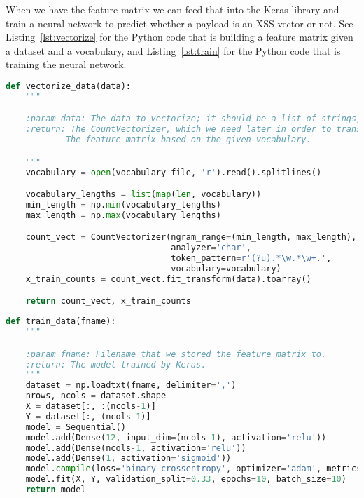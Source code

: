 \documentclass[10pt,journal,compsoc]{IEEEtran}
\begin{document}
When we have the feature matrix we can feed that into the Keras library and train a neural network to predict whether
a payload is an XSS vector or not. See Listing~\ref{lst:vectorize} for the Python code that is building a feature matrix
given a dataset and a vocabulary, and Listing~\ref{lst:train} for the Python code that is training the neural network.


\begin{lstlisting}[language=Python, caption={Python function that builds the feature matrix based on the dataset.},
                    label={lst:vectorize}]
def vectorize_data(data):
    """

    :param data: The data to vectorize; it should be a list of strings, one per line.
    :return: The CountVectorizer, which we need later in order to transform incoming requests to a feature vector
            The feature matrix based on the given vocabulary.

    """
    vocabulary = open(vocabulary_file, 'r').read().splitlines()

    vocabulary_lengths = list(map(len, vocabulary))
    min_length = np.min(vocabulary_lengths)
    max_length = np.max(vocabulary_lengths)

    count_vect = CountVectorizer(ngram_range=(min_length, max_length),
                                 analyzer='char',
                                 token_pattern=r'(?u).*\w.*\w+.',
                                 vocabulary=vocabulary)
    x_train_counts = count_vect.fit_transform(data).toarray()

    return count_vect, x_train_counts

\end{lstlisting}


\begin{lstlisting}[language=Python, caption={The Python function that builds a neural network and trains it using the feature matrix},
                    label={lst:train}]
def train_data(fname):
    """

    :param fname: Filename that we stored the feature matrix to.
    :return: The model trained by Keras.
    """
    dataset = np.loadtxt(fname, delimiter=',')
    nrows, ncols = dataset.shape
    X = dataset[:, :(ncols-1)]
    Y = dataset[:, (ncols-1)]
    model = Sequential()
    model.add(Dense(12, input_dim=(ncols-1), activation='relu'))
    model.add(Dense(ncols-1, activation='relu'))
    model.add(Dense(1, activation='sigmoid'))
    model.compile(loss='binary_crossentropy', optimizer='adam', metrics=['accuracy'])
    model.fit(X, Y, validation_split=0.33, epochs=10, batch_size=10)
    return model

\end{lstlisting}
\end{document}
